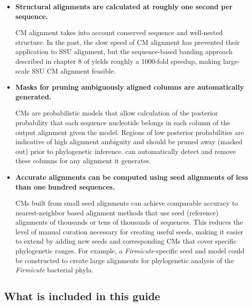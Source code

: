 \begin{itemize}

\item \textbf{Structural alignments are calculated at roughly one
  second per sequence.}  

  CM alignment takes into account conserved sequence and well-nested
  structure. In the past, the slow speed of CM alignment has prevented
  their application to SSU alignment, but the sequence-based banding
  approach described in chapter 8 of \cite{Nawrocki09b} yields roughly a 1000-fold speedup,
  making large-scale SSU CM alignment feasible.

\item \textbf{Masks for pruning ambiguously aligned columns are
  automatically generated.}
  
  CMs are probabilistic models that allow calculation of the posterior
  probability that each sequence nucleotide belongs in each column of the
  output alignment given the model. Regions of low posterior
  probabilities are indicative of high alignment ambiguity and
  should be pruned away (masked out) prior to phylogenetic
  inference.  can automatically detect and remove
  these columns for any alignment it generates.

\item \textbf{Accurate alignments can be computed using seed
  alignments of less than one hundred sequences.}

  CMs built from small seed alignments %
  can achieve comparable accuracy to nearest-neighbor based alignment
  methods that use seed (reference) alignments of thousands or tens of
  thousands of sequences. This reduces the level of manual curation
  necessary for creating useful seeds, making it easier to extend
   by adding new seeds and corresponding CMs that cover
  specific phylogenetic ranges. For example, a
  \emph{Firmicute}-specific seed and model could be constructed to
  create large alignments for phylogenetic analysis of the \emph{Firmicute}
  bacterial phyla.

\end{itemize}


\subsection{What is included in this guide}

